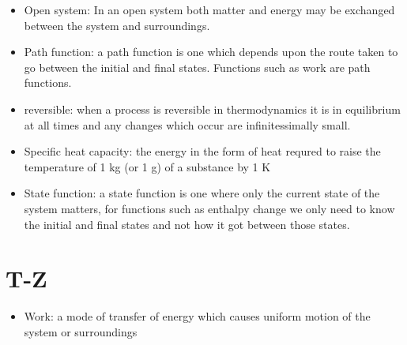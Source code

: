 \documentclass[
]{book}
\providecommand{\tightlist}{%
  \setlength{\itemsep}{0pt}\setlength{\parskip}{0pt}}
\begin{document}
\begin{itemize}
\item
  Open system: In an open system both matter and energy may be exchanged between the system and surroundings.
\item
  Path function: a path function is one which depends upon the route taken to go between the initial and final states. Functions such as work are path functions.
\item
  reversible: when a process is reversible in thermodynamics it is in equilibrium at all times and any changes which occur are infinitessimally small.
\item
  Specific heat capacity: the energy in the form of heat requred to raise the temperature of 1 kg (or 1 g) of a substance by 1 K
\item
  State function: a state function is one where only the current state of the system matters, for functions such as enthalpy change we only need to know the initial and final states and not how it got between those states.
\end{itemize}

\hypertarget{t-z}{%
\section*{T-Z}\label{t-z}}

\begin{itemize}
\tightlist
\item
  Work: a mode of transfer of energy which causes uniform motion of the system or surroundings
\end{itemize}

  
\end{document}
